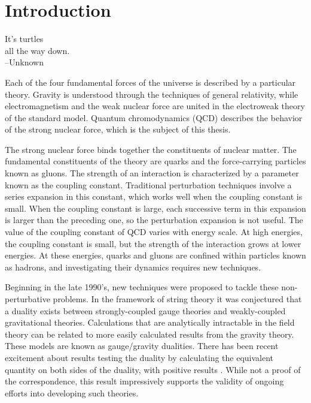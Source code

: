 \chapter{Introduction}
\label{intro_chapter}

\begin{flushright}
It's turtles \\
all the way down. \\
--Unknown
\end{flushright}

Each of the four fundamental forces of the universe is described by a particular theory. 
Gravity is understood through the techniques of general relativity, while electromagnetism and the weak nuclear force are united in the electroweak theory of the standard model.
Quantum chromodynamics (QCD) describes the behavior of the strong nuclear force, which is the subject of this thesis.

The strong nuclear force binds together the constituents of nuclear matter.
The fundamental constituents of the theory are quarks and the force-carrying particles known as gluons.
The strength of an interaction is characterized by a parameter known as the coupling constant. 
Traditional perturbation techniques involve a series expansion in this constant, which works well when the coupling constant is small.
When the coupling constant is large, each successive term in this expansion is larger than the preceding one, so the perturbation expansion is not useful.
The value of the coupling constant of QCD varies with energy scale.
At high energies, the coupling constant is small, but the strength of the interaction grows at lower energies.
At these energies, quarks and gluons are confined within particles known as hadrons, and investigating their dynamics requires new techniques.

Beginning in the late 1990's, new techniques were proposed to tackle these non-perturbative problems.
In the framework of string theory it was conjectured that a duality exists between strongly-coupled gauge theories and weakly-coupled gravitational theories.
Calculations that are analytically intractable in the field theory can be related to more easily calculated results from the gravity theory. 
These models are known as gauge/gravity dualities.
There has been recent excitement about results testing the duality by calculating the equivalent quantity on both sides of the duality, with positive results \cite{Hyakutake2013,Hanada2013}.
While not a proof of the correspondence, this result impressively supports the validity of ongoing efforts into developing such theories.

